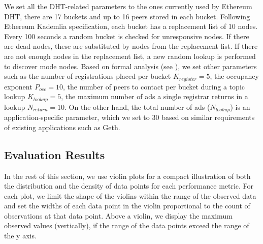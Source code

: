 We set all the DHT-related parameters to the ones currently used by Ethereum DHT, \ie there are 17 buckets and up to 16 peers stored in each bucket.
Following Ethereum Kademlia specification,  each bucket has a replacement list of 10 nodes. 
Every 100 seconds a random bucket is checked for unresponsive nodes. 
If there are dead nodes, these are substituted by nodes from the replacement list.  If there are not enough nodes in the replacement list,  a new random lookup is performed to discover mode nodes.
Based on formal analysis (see ), we set other \sysname parameters such as the number of registrations placed per bucket $K_\textit{register}= 5$, the occupancy exponent $P_\textit{occ} = 10$, the number of peers to contact per bucket during a topic lookup $K_\textit{lookup}=5$, the maximum number of ads a single registrar returns in a lookup $N_\textit{return}=10$. On the other hand, the total number of ads (\ie $N_\textit{lookup}$) is an application-specific parameter, which we set to 30 based on similar requirements of existing applications such as Geth.


\subsection{Evaluation Results}

In the rest of this section, we use violin plots for a compact illustration of both the distribution and the density of data points for each performance metric. For each plot, we limit the shape of the violins within the range of the observed data and set the widths of each data point in the violin proportional to the count of observations at that data point. 
Above a violin, we display the maximum observed values (vertically), if the range of the data points exceed the range of the y axis. 

